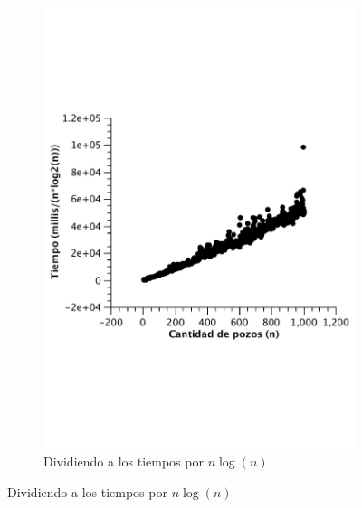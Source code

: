 \begin{figure}[H]
        \begin{subfigure}[b]{0.5\textwidth}
                \includegraphics[width=\textwidth]{imagenes/ej3-peor-lineal.pdf}
                \caption{Dividiendo a los tiempos por $n \log(n)$}
        \end{subfigure}

\end{figure}

